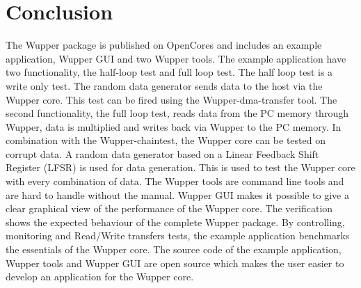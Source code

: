 \section{Conclusion}
The Wupper package is published on OpenCores and includes an example application, Wupper GUI and two Wupper tools.
The example application have two functionality, the half-loop test and full loop test. The half loop test is a write only test. The random data generator sends data to the host via the Wupper core. This test can be fired using the Wupper-dma-transfer tool.
The second functionality, the full loop test, reads data from the PC memory through Wupper, data is multiplied and writes back via Wupper to the PC memory. In combination with the Wupper-chaintest, the Wupper core can be tested on corrupt data.
A random data generator based on a Linear Feedback Shift Register (LFSR) is used for data generation. This is used to test the Wupper core with every combination of data.
The Wupper tools are command line tools and are hard to handle without the manual. Wupper GUI makes it possible to give a clear graphical view of the performance of the Wupper core.
The verification shows the expected behaviour of the complete Wupper package. By controlling, monitoring and Read/Write transfers tests, the example application benchmarks the essentials of the Wupper core. The source code of the example application, Wupper tools and Wupper GUI are open source which makes the user easier to develop an application for the Wupper core. 
\newpage